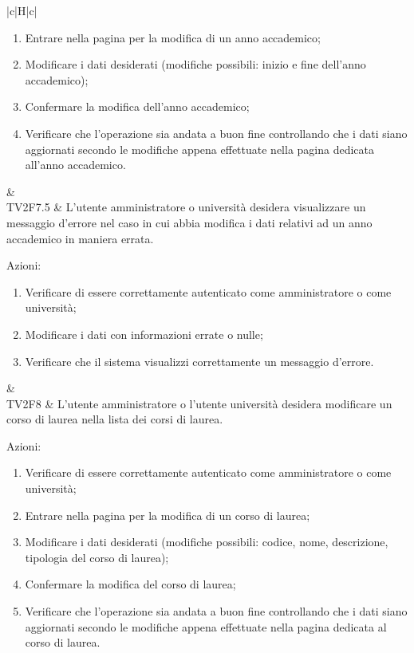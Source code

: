 \begin{longtable}{|c|H|c|}
\begin{enumerate}
		\item Entrare nella pagina per la modifica di un anno accademico;
		\item Modificare i dati desiderati (modifiche possibili: inizio e fine dell'anno accademico);
		\item Confermare la modifica dell'anno accademico;
		\item Verificare che l'operazione sia andata a buon fine controllando che i dati siano aggiornati secondo le modifiche appena effettuate nella pagina dedicata all'anno accademico.
	\end{enumerate} & \Ts \\ 
	\hline
	TV2F7.5 & L'utente amministratore o università desidera visualizzare un messaggio d'errore nel caso in cui abbia modifica i dati relativi ad un anno accademico in maniera errata. \newline \begin{flushleft}
		Azioni:\newline
	\end{flushleft} 
	\begin{enumerate}
		\item Verificare di essere correttamente autenticato come amministratore o come università;
		\item Modificare i dati con informazioni errate o nulle;
		\item Verificare che il sistema visualizzi correttamente un messaggio d'errore.
	\end{enumerate} & \Ts \\
	\hline
	TV2F8 & L'utente amministratore o l'utente università desidera modificare un corso di laurea nella lista dei corsi di laurea. \newline \begin{flushleft}
		Azioni:\newline
	\end{flushleft} 
		\begin{enumerate}
			\item Verificare di essere correttamente autenticato come amministratore o come università;
			\item Entrare nella pagina per la modifica di un corso di laurea;
			\item Modificare i dati desiderati (modifiche possibili: codice, nome, descrizione, tipologia del corso di laurea);
			\item Confermare la modifica del corso di laurea;
			\item Verificare che l'operazione sia andata a buon fine controllando che i dati siano aggiornati secondo le modifiche appena effettuate nella pagina dedicata al corso di laurea.

\end{enumerate}
\end{longtable}
